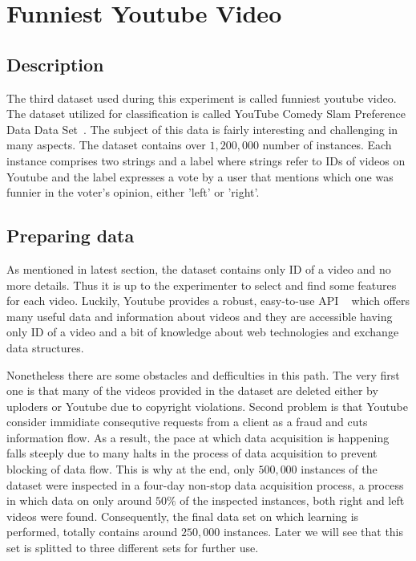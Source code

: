 \section{Funniest Youtube Video}
\label{db:sec:ds3}
\subsection{Description}

The third dataset used during this experiment is called funniest youtube video.
The dataset utilized for classification is called YouTube Comedy Slam Preference
Data Data Set~\cite{ds3:uci}. The subject of this data is fairly interesting and
challenging in many aspects. The dataset contains over $1,200,000$ number
of instances. Each instance comprises two strings and a label where strings
refer to IDs of videos on Youtube and the label expresses a vote by a
user that mentions which one was funnier in the voter's opinion, either 'left'
or 'right'.

\subsection{Preparing data}

As mentioned in latest section, the dataset contains only ID of a video and no
more details. Thus it is up to the experimenter to select and find some features
for each video. Luckily, Youtube provides a robust, easy-to-use API
~\cite{youtubeapi} which offers many useful data and information about videos and they are accessible having
only ID of a video and a bit of knowledge about web technologies and
exchange data structures. 

Nonetheless there are some obstacles and defficulties
in this path. The very first one is that many of the videos provided in the
dataset are deleted either by uploders or Youtube due to copyright violations.
Second problem is that Youtube consider immidiate consequtive requests from a
client as a fraud and cuts information flow. As a result, the pace at which data
acquisition is happening falls steeply due to many halts in the process of
data acquisition to prevent blocking of data flow. This is why at the end, only
$500,000$ instances of the dataset were inspected in a four-day non-stop data
acquisition process, a process in which data on only around $50\%$ of the
inspected instances, both right and left videos were found. Consequently, the
final data set on which learning is performed, totally contains around $250,000$
instances. Later we will see that this set is splitted to three different sets
for further use.

